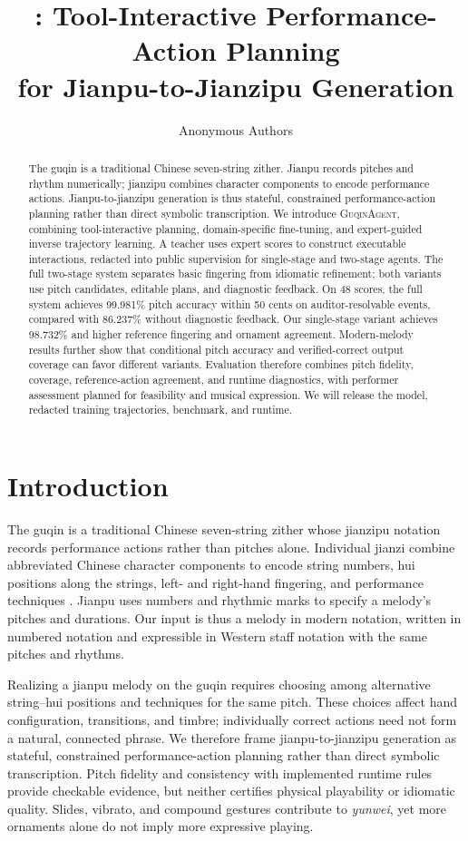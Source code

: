 \documentclass[11pt]{article}
\title{\system: Tool-Interactive Performance-Action Planning\\for Jianpu-to-Jianzipu Generation}
\author{Anonymous Authors}
\newcommand{\system}{\textsc{GuqinAgent}}
\begin{document}
\maketitle

\begin{abstract}
The guqin is a traditional Chinese seven-string zither. Jianpu records pitches and rhythm numerically; jianzipu combines character components to encode performance actions. Jianpu-to-jianzipu generation is thus stateful, constrained performance-action planning rather than direct symbolic transcription. We introduce \system, combining tool-interactive planning, domain-specific fine-tuning, and expert-guided inverse trajectory learning. A teacher uses expert scores to construct executable interactions, redacted into public supervision for single-stage and two-stage agents. The full two-stage system separates basic fingering from idiomatic refinement; both variants use pitch candidates, editable plans, and diagnostic feedback. On 48 scores, the full system achieves 99.981\% pitch accuracy within 50 cents on auditor-resolvable events, compared with 86.237\% without diagnostic feedback. Our single-stage variant achieves 98.732\% and higher reference fingering and ornament agreement. Modern-melody results further show that conditional pitch accuracy and verified-correct output coverage can favor different variants. Evaluation therefore combines pitch fidelity, coverage, reference-action agreement, and runtime diagnostics, with performer assessment planned for feasibility and musical expression. We will release the model, redacted training trajectories, benchmark, and runtime.
\end{abstract}

\section{Introduction}
The guqin is a traditional Chinese seven-string zither whose jianzipu notation records performance actions rather than pitches alone. Individual jianzi combine abbreviated Chinese character components to encode string numbers, hui positions along the strings, left- and right-hand fingering, and performance techniques \cite{li2026zeroshotjianzi,li2026jztab}. Jianpu uses numbers and rhythmic marks to specify a melody's pitches and durations. Our input is thus a melody in modern notation, written in numbered notation and expressible in Western staff notation with the same pitches and rhythms.

Realizing a jianpu melody on the guqin requires choosing among alternative string--hui positions and techniques for the same pitch. These choices affect hand configuration, transitions, and timbre; individually correct actions need not form a natural, connected phrase. We therefore frame jianpu-to-jianzipu generation as stateful, constrained performance-action planning rather than direct symbolic transcription. Pitch fidelity and consistency with implemented runtime rules provide checkable evidence, but neither certifies physical playability or idiomatic quality. Slides, vibrato, and compound gestures contribute to \emph{yunwei}, yet more ornaments alone do not imply more expressive playing.
\end{document}
